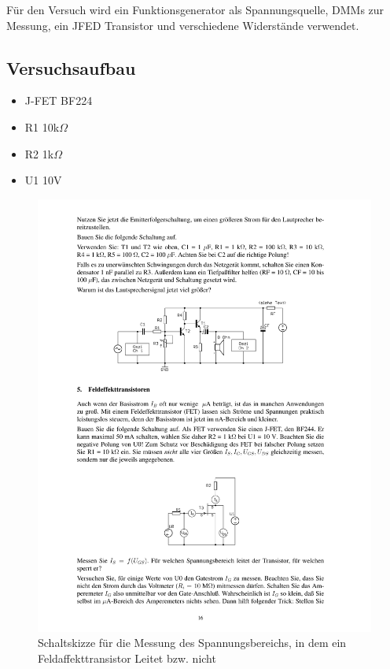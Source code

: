 \documentclass[12pt,a4paper]{article}
\begin{document}
Für den Versuch wird ein Funktionsgenerator als Spannungsquelle, DMMs zur Messung, ein JFED Transistor und verschiedene Widerstände verwendet.

\subsection{Versuchsaufbau}

\begin{itemize}
\item	J-FET BF224

\item	R1 10k$\Omega$

\item	R2 1k$\Omega$

\item	U1 10V
\end{itemize}

\begin{figure}[H] 
  \centering
    \includegraphics[trim = 10mm 50mm 10mm 174mm, clip, scale = 1]{ep3_14[Page16].pdf}
  	\caption[Schaltskizze für die Messung des Spannungsbereichs, in dem ein Feldaffekttransistor Leitet bzw. nicht]{Schaltskizze für die Messung des Spannungsbereichs, in dem ein Feldaffekttransistor Leitet bzw. nicht\footnotemark}
  \label{fig:7}
\end{figure}
\end{document}
